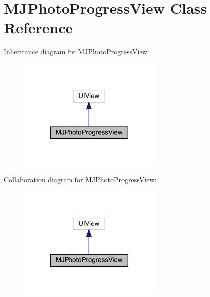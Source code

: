 \hypertarget{interface_m_j_photo_progress_view}{}\section{M\+J\+Photo\+Progress\+View Class Reference}
\label{interface_m_j_photo_progress_view}


Inheritance diagram for M\+J\+Photo\+Progress\+View\+:\nopagebreak
\begin{figure}[H]
\begin{center}
\leavevmode
\includegraphics[width=197pt]{interface_m_j_photo_progress_view__inherit__graph}
\end{center}
\end{figure}


Collaboration diagram for M\+J\+Photo\+Progress\+View\+:\nopagebreak
\begin{figure}[H]
\begin{center}
\leavevmode
\includegraphics[width=197pt]{interface_m_j_photo_progress_view__coll__graph}
\end{center}
\end{figure}
